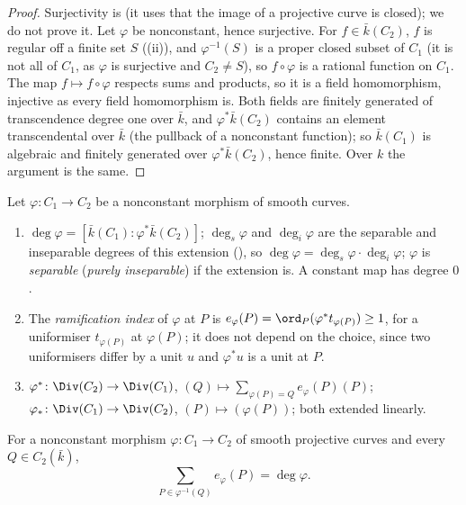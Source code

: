 \begin{proof}
Surjectivity is \cite[Chapter II, Theorem 2.3]{SilvermanAEC} (it uses that the image of a projective curve is closed); we do not prove it. Let $\varphi$ be
nonconstant, hence surjective. For $f\in\bar k(C_2)$, $f$ is regular off a finite set $S$ ((ii)), and $\varphi^{-1}(S)$ is a proper
closed subset of $C_1$ (it is not all of $C_1$, as $\varphi$ is surjective and $C_2\ne S$), so $f\circ\varphi$ is a rational function on $C_1$. The map $f\mapsto f\circ\varphi$
respects sums and products, so it is a field homomorphism, injective as every field homomorphism is. Both fields are finitely generated of
transcendence degree one over $\bar k$, and $\varphi^*\bar k(C_2)$ contains an element transcendental over $\bar k$ (the pullback of a nonconstant function);
so $\bar k(C_1)$ is algebraic and finitely generated over $\varphi^*\bar k(C_2)$, hence finite. Over $k$ the argument is the same.
\end{proof}

\begin{definition}\label{def:curves:degree}
Let $\varphi\colon C_1\to C_2$ be a nonconstant morphism of smooth curves.
\begin{enumerate}[label=(\roman*)]
\item $\deg\varphi=[\bar k(C_1):\varphi^*\bar k(C_2)]$; $\deg_s\varphi$ and $\deg_i\varphi$ are the separable and inseparable degrees of this extension (), so
$\deg\varphi=\deg_s\varphi\cdot\deg_i\varphi$; $\varphi$ is \emph{separable} (\emph{purely inseparable}) if the extension is. A constant map has degree $0$.
\item The \emph{ramification index} of $\varphi$ at $P$ is $e_\varphi(P)=\ord_P(\varphi^*t_{\varphi(P)})\ge1$, for a uniformiser $t_{\varphi(P)}$ at $\varphi(P)$; it does not depend on the
choice, since two uniformisers differ by a unit $u$ and $\varphi^*u$ is a unit at $P$.
\item $\varphi^*\colon\Div(C_2)\to\Div(C_1)$, $(Q)\mapsto\sum_{\varphi(P)=Q}e_\varphi(P)(P)$; $\varphi_*\colon\Div(C_1)\to\Div(C_2)$, $(P)\mapsto(\varphi(P))$; both extended linearly.
\end{enumerate}
\end{definition}

\begin{theorem}\label{thm:curves:degree-formula}
For a nonconstant morphism $\varphi\colon C_1\to C_2$ of smooth projective curves and every $Q\in C_2(\bar k)$,
\[
\sum_{P\in\varphi^{-1}(Q)}e_\varphi(P)=\deg\varphi.
\]
\end{theorem}

